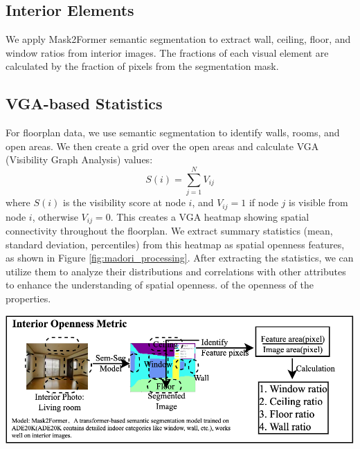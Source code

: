 \documentclass[11pt,a4paper]{article}
\begin{document}
\begin{multicols}{2}
\subsection{Interior Elements}
We apply Mask2Former semantic segmentation to extract wall, ceiling, floor, and window ratios from interior images. 
The fractions of each visual element are calculated by the fraction of pixels from the segmentation mask.



\subsection{VGA-based Statistics}
For floorplan data, we use semantic segmentation to identify walls, rooms, and open areas. 
We then create a grid over the open areas and calculate VGA (Visibility Graph Analysis) values:
\begin{equation}
\label{eq:vga_definition}
S(i) = \sum_{j=1}^{N} V_{ij}
\end{equation}
where $S(i)$ is the visibility score at node $i$, and $V_{ij} = 1$ if node $j$ is visible from node $i$, otherwise $V_{ij} = 0$. 
This creates a VGA heatmap showing spatial connectivity throughout the floorplan. We extract summary statistics 
(mean, standard deviation, percentiles) from this heatmap as spatial openness features, as shown in Figure \ref{fig:madori_processing}.
After extracting the statistics, we can utilize them to analyze their distributions and correlations with other attributes to enhance the understanding of spatial openness.
of the openness of the properties.

\begin{center}
    \includegraphics[width=0.99\columnwidth]{plots/exp_lv_semseg_5.png}
    \label{fig:interior_semseg}
\end{center}


\end{multicols}
\end{document}
